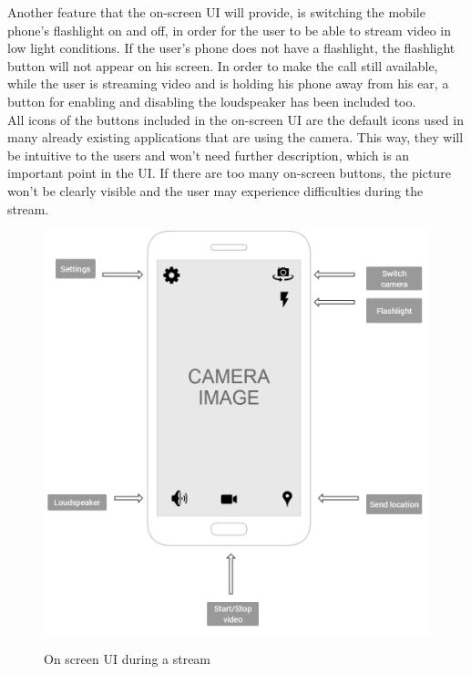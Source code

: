 \documentclass{article}
\begin{document}
Another feature that the on-screen UI will provide, is switching the mobile phone’s flashlight on and off, in order for the user to be able to stream video in low light conditions. If the user’s phone does not have a flashlight, the flashlight button will not appear on his screen.
In order to make the call still available, while the user is streaming video and is holding his phone away from his ear, a button for enabling and disabling the loudspeaker has been included too.\\

All icons of the buttons included in the on-screen UI are the default icons used in many already existing applications that are using the camera. This way, they will be intuitive to the users and won’t need further description, which is an important point in the UI. If there are too many on-screen buttons, the picture won’t be clearly visible and the user may experience difficulties during the stream.\\

	\begin{figure}[H]
		\centering
		\includegraphics[width=.9\textwidth]{"EmergencyAppIteration2/iteration2ui (1)"}
		
		On screen UI during a stream
	\end{figure}
\end{document}
